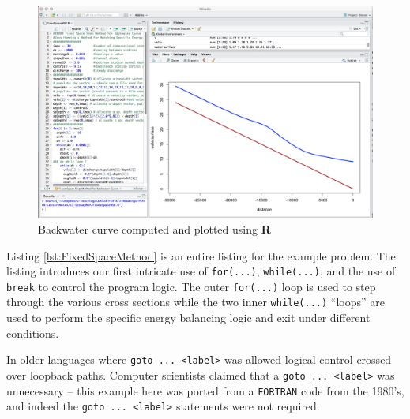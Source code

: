 \begin{figure}[h!] %
   \centering
   \includegraphics[width=5.6in]{./13-SteadyWSP/ExamplePlot.jpg} 
   \caption{Backwater curve computed and plotted using \textbf{R}}
   \label{fig:ExamplePlot}
\end{figure}

Listing \ref{lst:FixedSpaceMethod} is an entire listing for the example problem.  
The listing introduces our first intricate use of \texttt{for(...)}, \texttt{while(...)}, and the use of \texttt{break} to control the program logic.   The outer \texttt{for(...)} loop is used to step through the various cross sections while the two inner \texttt{while(...)} ``loops'' are used to perform the specific energy balancing logic and exit under different conditions.

In older languages where \texttt{goto ... <label>} was allowed logical control crossed over loopback paths.  
Computer scientists claimed that a  \texttt{goto ... <label>} was unnecessary -- this example here was ported from a \texttt{FORTRAN} code from the 1980's, and indeed the  \texttt{goto ... <label>} statements were not required.
\clearpage

